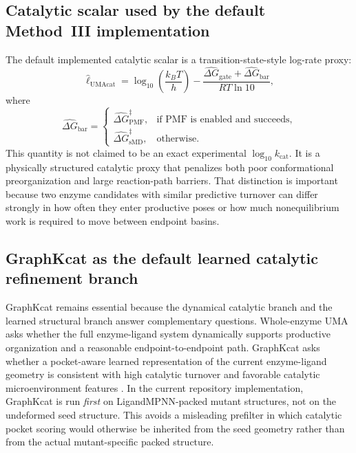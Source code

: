 \documentclass[11pt]{article}
\newcommand{\logkcat}{\ensuremath{\log_{10} k_{\mathrm{cat}}}}
\begin{document}
	\subsection{Catalytic scalar used by the default Method~III implementation}
	
	The default implemented catalytic scalar is a transition-state-style log-rate proxy:
	\begin{equation}
		\widehat \ell_{\mathrm{UMAcat}}
		=
		\log_{10}\!\left(\frac{k_B T}{h}\right)
		-
		\frac{\widehat{\Delta G}_{\mathrm{gate}}+\widehat{\Delta G}_{\mathrm{bar}}}{RT\ln 10},
	\end{equation}
	where
	\begin{equation}
		\widehat{\Delta G}_{\mathrm{bar}}
		=
		\begin{cases}
			\widehat{\Delta G}_{\mathrm{PMF}}^\ddagger, & \text{if PMF is enabled and succeeds},\\
			\widehat{\Delta G}_{\mathrm{sMD}}^\ddagger, & \text{otherwise.}
		\end{cases}
	\end{equation}
	This quantity is not claimed to be an exact experimental $\logkcat$. It is a physically structured catalytic proxy that penalizes both poor conformational preorganization and large reaction-path barriers. That distinction is important because two enzyme candidates with similar predictive turnover can differ strongly in how often they enter productive poses or how much nonequilibrium work is required to move between endpoint basins.
	
	\subsection{GraphKcat as the default learned catalytic refinement branch}
	
	GraphKcat remains essential because the dynamical catalytic branch and the learned structural branch answer complementary questions. Whole-enzyme UMA asks whether the full enzyme-ligand system dynamically supports productive organization and a reasonable endpoint-to-endpoint path. GraphKcat asks whether a pocket-aware learned representation of the current enzyme-ligand geometry is consistent with high catalytic turnover and favorable catalytic microenvironment features \citep{luo2025graphkcat}. In the current repository implementation, GraphKcat is run \emph{first} on LigandMPNN-packed mutant structures, not on the undeformed seed structure. This avoids a misleading prefilter in which catalytic pocket scoring would otherwise be inherited from the seed geometry rather than from the actual mutant-specific packed structure.
	
\end{document}
